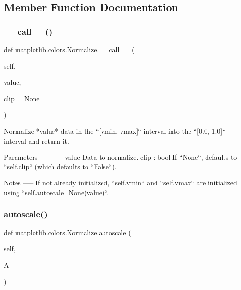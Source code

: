 \subsection{Member Function Documentation}
\mbox{\label{classmatplotlib_1_1colors_1_1Normalize_ac322f42dbcaca3daed36a5801f09dce4}} 
\subsubsection{\texorpdfstring{\+\_\+\+\_\+call\+\_\+\+\_\+()}{\_\_call\_\_()}}
{\footnotesize\ttfamily def matplotlib.\+colors.\+Normalize.\+\_\+\+\_\+call\+\_\+\+\_\+ (\begin{DoxyParamCaption}\item[{}]{self,  }\item[{}]{value,  }\item[{}]{clip = {\ttfamily None} }\end{DoxyParamCaption})}

\begin{DoxyVerb}Normalize *value* data in the ``[vmin, vmax]`` interval into the
``[0.0, 1.0]`` interval and return it.

Parameters
----------
value
    Data to normalize.
clip : bool
    If ``None``, defaults to ``self.clip`` (which defaults to
    ``False``).

Notes
-----
If not already initialized, ``self.vmin`` and ``self.vmax`` are
initialized using ``self.autoscale_None(value)``.
\end{DoxyVerb}
 \mbox{\label{classmatplotlib_1_1colors_1_1Normalize_ab4dcc61fd1f11e25bce825dab4669816}} 
\subsubsection{\texorpdfstring{autoscale()}{autoscale()}}
{\footnotesize\ttfamily def matplotlib.\+colors.\+Normalize.\+autoscale (\begin{DoxyParamCaption}\item[{}]{self,  }\item[{}]{A }\end{DoxyParamCaption})}

